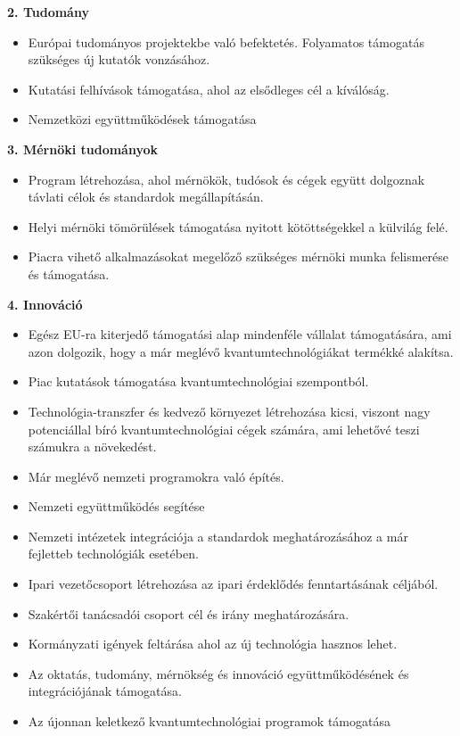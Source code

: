 \textbf{\color{blue}2. Tudomány} 
\begin{itemize}
\item Európai tudományos projektekbe való befektetés. Folyamatos támogatás szükséges új kutatók vonzásához.
\item Kutatási felhívások támogatása, ahol az elsődleges cél a kíválóság.
\item Nemzetközi együttműködések támogatása
\end{itemize}
\textbf{\color{blue}3. Mérnöki tudományok} 
\begin{itemize}
\item Program létrehozása, ahol mérnökök, tudósok és cégek együtt dolgoznak távlati célok és standardok megállapításán.
\item Helyi mérnöki tömörülések támogatása nyitott kötöttségekkel a külvilág felé.
\item Piacra vihető alkalmazásokat megelőző szükséges mérnöki munka felismerése és támogatása.
\end{itemize}
\textbf{\color{blue}4. Innováció} 
\begin{itemize}
\item Egész EU-ra kiterjedő támogatási alap mindenféle vállalat támogatására, ami azon dolgozik, hogy a már meglévő kvantumtechnológiákat termékké alakítsa.
\item Piac kutatások támogatása kvantumtechnológiai szempontból.
\item Technológia-transzfer és kedvező környezet létrehozása kicsi, viszont nagy potenciállal bíró kvantumtechnológiai cégek számára, ami lehetővé teszi számukra a növekedést.
\item Már meglévő nemzeti programokra való építés.
\item Nemzeti együttműködés segítése
\item Nemzeti intézetek integrációja a standardok meghatározásához a már fejletteb technológiák esetében.
\item Ipari vezetőcsoport létrehozása az ipari érdeklődés fenntartásának céljából.
\item Szakértői tanácsadói csoport cél és irány meghatározására.
\item Kormányzati igények feltárása ahol az új technológia hasznos lehet.
\item Az oktatás, tudomány, mérnökség és innováció együttműködésének és integrációjának támogatása.
\item Az újonnan keletkező kvantumtechnológiai programok támogatása
\end{itemize}
